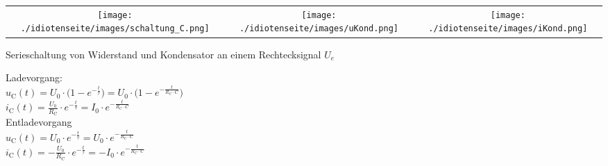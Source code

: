 \begin{tabular}{ccc}
	\texttt{[image: ./idiotenseite/images/schaltung\_C.png]} &
	\texttt{[image: ./idiotenseite/images/uKond.png]} &
	\texttt{[image: ./idiotenseite/images/iKond.png]}\\
\end{tabular}
Serieschaltung von Widerstand und Kondensator an einem Rechtecksignal $U_e$
\begin{multicols}{2}		
	Ladevorgang:\\
	$u_{\mathrm{C}} (t) = U_0 \cdot \biggl(1 - e^{- \frac{t}{\tau}}\biggr) = U_0
	\cdot \biggl(1 - e^{- \frac{t}{R_{\mathrm{C}} \cdot C}}\biggr)$\\
	$i_{\mathrm{C}} (t) = \frac{U_0}{R_{\mathrm{C}}} \cdot e^{- \frac{t}{\tau}} =
	I_0 \cdot e^{- \frac{t}{R_{\mathrm{C}} \cdot C}}$\\
	\newline
	Entladevorgang\\
	$u_{\mathrm{C}} (t) = U_0 \cdot e^{- \frac{t}{\tau}} = U_0 \cdot e^{-
	\frac{t}{R_{\mathrm{C}} \cdot C}}$\\
	$i_{\mathrm{C}} (t) = -	\frac{U_0}{R_{\mathrm{C}}} \cdot e^{- \frac{t}{\tau}}
	= - I_0 \cdot e^{-\frac{t}{R_{\mathrm{C}} \cdot C}}$\\
\end{multicols}


